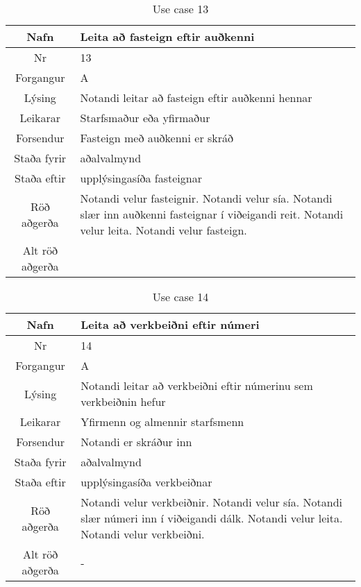 \begin{table}[h!]\centering
\begin{tabular}{|c|p{10cm}|}
\hline
Nafn&Leita að fasteign eftir auðkenni\\
\hline
Nr&13\\
\hline
Forgangur&A\\
\hline
Lýsing&Notandi leitar að fasteign eftir auðkenni hennar\\
\hline
Leikarar&Starfsmaður eða yfirmaður\\
\hline
Forsendur&Fasteign með auðkenni er skráð\\
\hline
Staða fyrir&aðalvalmynd\\
\hline
Staða eftir&upplýsingasíða fasteignar\\
\hline
Röð aðgerða&Notandi velur fasteignir. Notandi velur sía. Notandi slær inn auðkenni fasteignar í viðeigandi reit. Notandi velur leita. Notandi velur fasteign.\\
\hline
Alt röð aðgerða&\\
\hline
\end{tabular}
\caption{Use case 13}\label{tab:use_case_13}
\end{table}
\begin{table}[h!]\centering
\begin{tabular}{|c|p{10cm}|}
\hline
Nafn&Leita að verkbeiðni eftir númeri\\
\hline
Nr&14\\
\hline
Forgangur&A\\
\hline
Lýsing&Notandi leitar að verkbeiðni eftir númerinu sem verkbeiðnin hefur\\
\hline
Leikarar&Yfirmenn og almennir starfsmenn\\
\hline
Forsendur&Notandi er skráður inn\\
\hline
Staða fyrir&aðalvalmynd\\
\hline
Staða eftir&upplýsingasíða verkbeiðnar\\
\hline
Röð aðgerða&Notandi velur verkbeiðnir. Notandi velur sía. Notandi slær númeri inn í viðeigandi dálk. Notandi velur leita. Notandi velur verkbeiðni.\\
\hline
Alt röð aðgerða&-\\
\hline
\end{tabular}
\caption{Use case 14}\label{tab:use_case_14}
\end{table}
